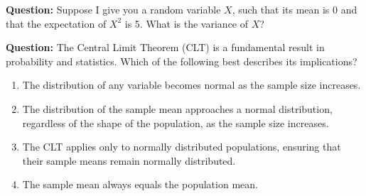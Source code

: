\documentclass[12pt]{article}
\begin{document}
\textbf{Question:}
Suppose I give you a random variable $X$, such that its mean is 0 and that the expectation of $X^2$ is 5. What is the variance of $X$?

\textbf{Question:}  
The Central Limit Theorem (CLT) is a fundamental result in probability and statistics. Which of the following best describes its implications?  
\begin{enumerate}
    \item[(A)] The distribution of any variable becomes normal as the sample size increases.  
    \item[(B)] The distribution of the sample mean approaches a normal distribution, regardless of the shape of the population, as the sample size increases.  
    \item[(C)] The CLT applies only to normally distributed populations, ensuring that their sample means remain normally distributed.  
    \item[(D)] The sample mean always equals the population mean.  
\end{enumerate}
\end{document}
